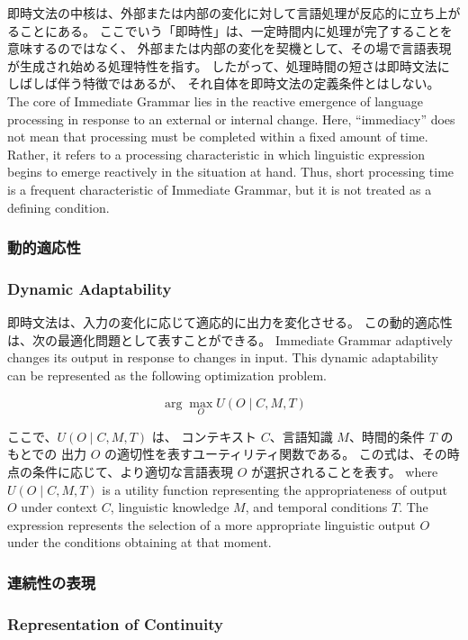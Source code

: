\documentclass[a4paper]{article}
\begin{document}
\ifJPN
即時文法の中核は、外部または内部の変化に対して言語処理が反応的に立ち上がることにある。
ここでいう「即時性」は、一定時間内に処理が完了することを意味するのではなく、
外部または内部の変化を契機として、その場で言語表現が生成され始める処理特性を指す。
したがって、処理時間の短さは即時文法にしばしば伴う特徴ではあるが、
それ自体を即時文法の定義条件とはしない。
\else
The core of Immediate Grammar lies in the reactive emergence of language processing in response to an external or internal change.
Here, “immediacy” does not mean that processing must be completed within a fixed amount of time.
Rather, it refers to a processing characteristic in which linguistic expression begins to emerge reactively in the situation at hand.
Thus, short processing time is a frequent characteristic of Immediate Grammar, but it is not treated as a defining condition.
\fi

\ifJPN
\subsubsection{動的適応性}
\else
\subsubsection{Dynamic Adaptability}
\fi

\ifJPN
即時文法は、入力の変化に応じて適応的に出力を変化させる。
この動的適応性は、次の最適化問題として表すことができる。
\else
Immediate Grammar adaptively changes its output in response to changes in input.
This dynamic adaptability can be represented as the following optimization problem.
\fi

\[
\arg\max_{O} U(O \mid C, M, T)
\]

\ifJPN
ここで、\( U(O \mid C, M, T) \) は、
コンテキスト \( C \)、言語知識 \( M \)、時間的条件 \( T \) のもとでの
出力 \( O \) の適切性を表すユーティリティ関数である。
この式は、その時点の条件に応じて、より適切な言語表現 \( O \) が選択されることを表す。
\else
where \( U(O \mid C, M, T) \) is a utility function representing
the appropriateness of output \( O \) under context \( C \),
linguistic knowledge \( M \), and temporal conditions \( T \).
The expression represents the selection of a more appropriate linguistic output \( O \)
under the conditions obtaining at that moment.
\fi

\ifJPN
\subsubsection{連続性の表現}
\else
\subsubsection{Representation of Continuity}
\fi
\end{document}

